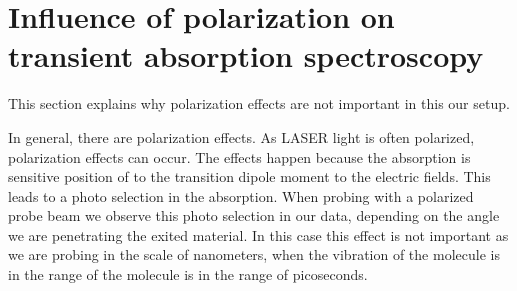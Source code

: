 \section[Polarization effects]{Influence of polarization on transient absorption spectroscopy}
\label{sec:TheoPolarization}

This section explains why polarization effects are not important in this our setup.

In general, there are polarization effects. As LASER light is often polarized, polarization effects can occur. The effects happen because
the absorption is sensitive position of to the transition dipole moment to the electric fields. This leads to a photo selection in the absorption. When probing with a polarized probe beam 
we observe this photo selection in our data, depending on the angle we are penetrating the exited material. In this case this effect is not important as we are probing in the scale of nanometers, when the vibration of the molecule is in the range of
the molecule is in the range of picoseconds.

